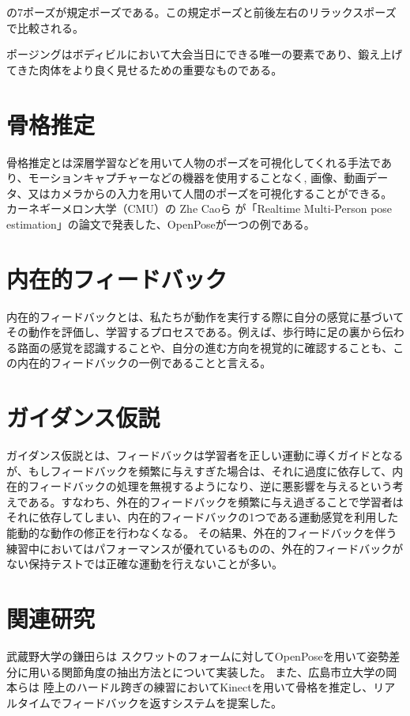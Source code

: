 の7ポーズが規定ポーズである。この規定ポーズと前後左右のリラックスポーズで比較される。

ポージングはボディビルにおいて大会当日にできる唯一の要素であり、鍛え上げてきた肉体をより良く見せるための重要なものである。
\section{骨格推定}
骨格推定とは深層学習などを用いて人物のポーズを可視化してくれる手法であり、モーションキャプチャーなどの機器を使用することなく,
画像、動画データ、又はカメラからの入力を用いて人間のポーズを可視化することができる。
カーネギーメロン大学（CMU）の Zhe Caoら が「Realtime Multi-Person pose estimation」\cite{openpose}の論文で発表した、OpenPoseが一つの例である。

\section{内在的フィードバック}
内在的フィードバックとは、私たちが動作を実行する際に自分の感覚に基づいてその動作を評価し、学習するプロセスである。例えば、歩行時に足の裏から伝わる路面の感覚を認識することや、自分の進む方向を視覚的に確認することも、この内在的フィードバックの一例であることと言える。\cite{nagoyahml_feedback}
\section{ガイダンス仮説}
ガイダンス仮説\cite{guidance_hypothesis}とは、フィードバックは学習者を正しい運動に導くガイドとなるが、もしフィードバックを頻繁に与えすぎた場合は、それに過度に依存して、内在的フィードバックの処理を無視するようになり、逆に悪影響を与えるという考えである。すなわち、外在的フィードバックを頻繁に与え過ぎることで学習者はそれに依存してしまい、内在的フィードバックの1つである運動感覚を利用した能動的な動作の修正を行わなくなる。
その結果、外在的フィードバックを伴う練習中においてはパフォーマンスが優れているものの、外在的フィードバックがない保持テストでは正確な運動を行えないことが多い。
\section{関連研究}
武蔵野大学の鎌田らは \cite{Relatedresearch1}スクワットのフォームに対してOpenPoseを用いて姿勢差分に用いる関節角度の抽出方法とについて実装した。
また、広島市立大学の岡本らは \cite{Relatedresearch2}陸上のハードル跨ぎの練習においてKinectを用いて骨格を推定し、リアルタイムでフィードバックを返すシステムを提案した。
